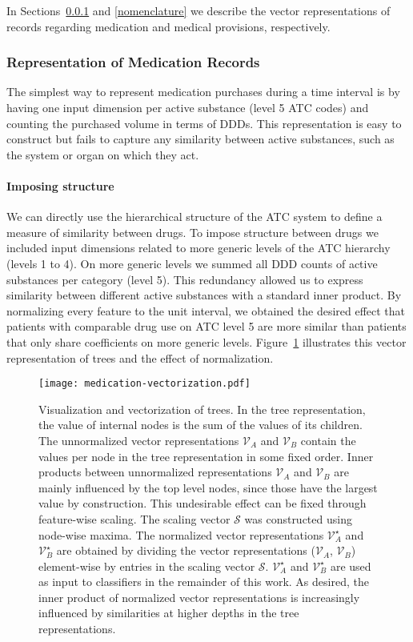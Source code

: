 \documentclass[twoside,11pt]{article}
\begin{document}
In Sections~\ref{ATC-vectorization} and \ref{nomenclature} we describe the vector representations of records regarding medication and medical provisions, respectively.


\subsubsection{Representation of Medication Records} \label{ATC-vectorization}
The simplest way to represent medication purchases during a time interval is by having one input dimension per active substance (level 5 ATC codes) and counting the purchased volume in terms of DDDs. This representation is easy to construct but fails to capture any similarity between active substances, such as the system or organ on which they act.

\paragraph{Imposing structure}
We can directly use the hierarchical structure of the ATC system to define a measure of similarity between drugs. To impose structure between drugs we included input dimensions related to more generic levels of the ATC hierarchy (levels 1 to 4). On more generic levels we summed all DDD counts of active substances per category (level 5). This redundancy allowed us to express similarity between different active substances with a standard inner product. By normalizing every feature to the unit interval, we obtained the desired effect that patients with comparable drug use on ATC level 5 are more similar than patients that only share coefficients on more generic levels.
Figure~\ref{fig:medication-vectorization} illustrates this vector representation of trees and the effect of normalization.

\begin{figure}[!h]
  \centering
  \texttt{[image: medication-vectorization.pdf]}
  \caption{Visualization and vectorization of trees. In the tree representation, the value of internal nodes is the sum of the values of its children. The unnormalized vector representations $\mathcal{V}_A$ and $\mathcal{V}_B$ contain the values per node in the tree representation in some fixed order. Inner products between unnormalized representations $\mathcal{V}_A$ and $\mathcal{V}_B$ are mainly influenced by the top level nodes, since those have the largest value by construction. This undesirable effect can be fixed through feature-wise scaling. The scaling vector $\mathcal{S}$ was constructed using node-wise maxima. The normalized vector representations $\mathcal{V}_A^\star$ and $\mathcal{V}_B^\star$ are obtained by dividing the vector representations ($\mathcal{V}_A$, $\mathcal{V}_B$) element-wise by entries in the scaling vector $\mathcal{S}$. $\mathcal{V}_A^\star$ and $\mathcal{V}_B^\star$ are used as input to classifiers in the remainder of this work. As desired, the inner product of normalized vector representations is increasingly influenced by similarities at higher depths in the tree representations.} 
  \label{fig:medication-vectorization}
\end{figure}
\end{document}
